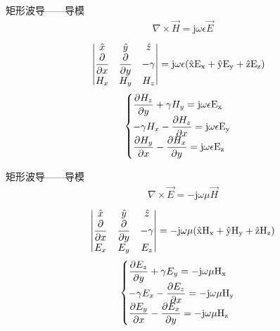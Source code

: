 \begin{frame}{矩形波导——导模}
    \begin{align*}
        \nabla\times\vec{H}=\mathrm{j}\omega\epsilon \vec{E}
    \end{align*}
    \begin{align*}
         & \begin{vmatrix}
               \hat{x}                      & \hat{y}                      & \hat{z} \\
               \dfrac{\partial}{\partial x} & \dfrac{\partial}{\partial y} & -\gamma \\
               H_x                          & H_y                          & H_z     \\
           \end{vmatrix}
        =\rm{j}\omega\epsilon(\hat{x}E_x+\hat{y}E_y+\hat{z}E_z)
    \end{align*}
    \begin{align}
        \begin{cases}
            \dfrac{\partial H_z}{\partial y}+\gamma H_y=\rm{j}\omega\epsilon E_x  \\
            -\gamma H_x-\dfrac{\partial H_z}{\partial x}=\rm{j}\omega\epsilon E_y \\
            \dfrac{\partial H_y}{\partial x}-\dfrac{\partial H_x}{\partial y}=\rm{j}\omega\epsilon E_z
        \end{cases}
    \end{align}
\end{frame}

\begin{frame}{矩形波导——导模}
    \begin{align*}
        \nabla\times\vec{E}=-\mathrm{j}\omega\mu \vec{H}
    \end{align*}
    \begin{align*}
        \begin{vmatrix}
            \hat{x}                      & \hat{y}                      & \hat{z} \\
            \dfrac{\partial}{\partial x} & \dfrac{\partial}{\partial y} & -\gamma \\
            E_x                          & E_y                          & E_z     \\
        \end{vmatrix}
        =-\rm{j}\omega\mu(\hat{x}H_x+\hat{y}H_y+\hat{z}H_z)
    \end{align*}
    \begin{align}
        \begin{cases}
            \dfrac{\partial E_z}{\partial y}+\gamma E_y=-\rm{j}\omega\mu H_x  \\
            -\gamma E_x-\dfrac{\partial E_z}{\partial x}=-\rm{j}\omega\mu H_y \\
            \dfrac{\partial E_y}{\partial x}-\dfrac{\partial E_x}{\partial y}=-\rm{j}\omega\mu H_z
        \end{cases}
    \end{align}
\end{frame}

